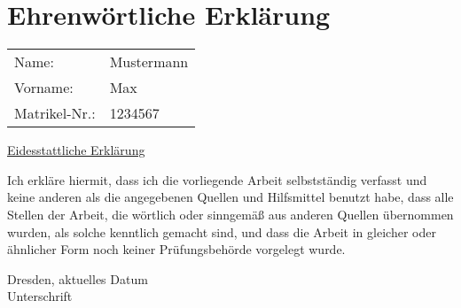 \chapter{Ehrenwörtliche Erklärung}\label{eides}
\thispagestyle {empty}

\begin{tabular}{ll}
  Name: & Mustermann \\
  Vorname: & Max \\
  Matrikel-Nr.: & 1234567 \\
\end{tabular}

\vspace{15mm}

\begin{center}\underline{Eidesstattliche Erklärung}\end{center}
Ich erkläre hiermit, dass ich die vorliegende Arbeit
selbstständig verfasst und keine anderen als die angegebenen Quellen
und Hilfsmittel benutzt habe, dass alle Stellen der Arbeit, die
wörtlich oder sinngemäß aus anderen Quellen übernommen wurden, als
solche kenntlich gemacht sind, und dass die Arbeit in gleicher
oder ähnlicher Form noch keiner Prüfungsbehörde vorgelegt wurde.\\

\vspace{30mm}

Dresden, aktuelles Datum \hspace{35mm} \hrulefill \\
\hspace*{83mm} Unterschrift